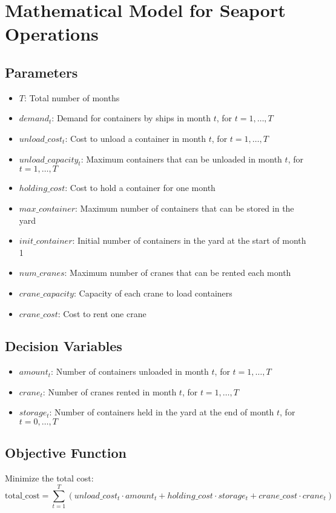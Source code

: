 \documentclass{article}
\begin{document}
\section*{Mathematical Model for Seaport Operations}

\subsection*{Parameters}
\begin{itemize}
    \item $T$: Total number of months
    \item $demand_{t}$: Demand for containers by ships in month $t$, for $t = 1, \ldots, T$
    \item $unload\_cost_{t}$: Cost to unload a container in month $t$, for $t = 1, \ldots, T$
    \item $unload\_capacity_{t}$: Maximum containers that can be unloaded in month $t$, for $t = 1, \ldots, T$
    \item $holding\_cost$: Cost to hold a container for one month
    \item $max\_container$: Maximum number of containers that can be stored in the yard
    \item $init\_container$: Initial number of containers in the yard at the start of month 1
    \item $num\_cranes$: Maximum number of cranes that can be rented each month
    \item $crane\_capacity$: Capacity of each crane to load containers
    \item $crane\_cost$: Cost to rent one crane
\end{itemize}

\subsection*{Decision Variables}
\begin{itemize}
    \item $amount_{t}$: Number of containers unloaded in month $t$, for $t = 1, \ldots, T$
    \item $crane_{t}$: Number of cranes rented in month $t$, for $t = 1, \ldots, T$
    \item $storage_{t}$: Number of containers held in the yard at the end of month $t$, for $t = 0, \ldots, T$
\end{itemize}

\subsection*{Objective Function}
Minimize the total cost:
\[
\text{total\_cost} = \sum_{t=1}^{T} \left( unload\_cost_{t} \cdot amount_{t} + holding\_cost \cdot storage_{t} + crane\_cost \cdot crane_{t} \right)
\]
\end{document}
